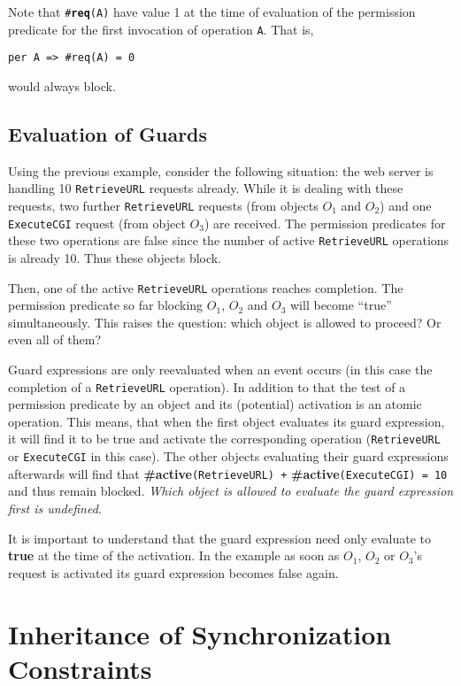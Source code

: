 \documentclass{overturerepchap}
\newcommand{\keyw}[1]{{\bf\ttfamily #1}}
\begin{document}
{\begin{description}
Note that \texttt{\#\keyw{req}(A)} have value 1 at the time of evaluation of
the permission predicate for the first invocation of operation
\texttt{A}. That is,
\begin{lstlisting}
per A => #req(A) = 0
\end{lstlisting}
would always block.

\end{description}

\subsection{Evaluation of Guards}

Using the previous example, consider the following situation: the web
server is handling 10 \texttt{RetrieveURL} requests already. While it
is dealing with these requests, two further \texttt{RetrieveURL}
requests (from objects $O_1$ and $O_2$) and one \texttt{ExecuteCGI}
request (from object $O_3$) are received. The permission predicates
for these two operations are false since the number of active
\texttt{RetrieveURL} operations is already 10. Thus these objects
block.

Then, one of the active \texttt{RetrieveURL} operations reaches
completion. The permission predicate so far blocking $O_1$, $O_2$ and
$O_3$ will become ``true'' simultaneously.
This raises the question: which object is allowed to proceed? Or even
all of them?

Guard expressions are only reevaluated when an event occurs (in this
case the completion of a \texttt{RetrieveURL} operation). In addition to
that the test of a permission predicate by an object and its (potential)
activation is an atomic operation. This means, that when the first
object evaluates its guard expression, it will find it to be true and
activate the corresponding operation (\texttt{RetrieveURL} or
\texttt{ExecuteCGI} in this case). The other objects evaluating their
guard expressions afterwards will find that
\keyw{\#active}{\tt (RetrieveURL) +} \keyw{\#active}{\tt (ExecuteCGI) = 10}
and thus remain blocked. \textit{Which object is allowed to evaluate the guard
expression first is undefined.}

It is important to understand that the guard expression need only
evaluate to \keyw{true} at the time of the activation. In the
example as soon as $O_1$, $O_2$ or $O_3$'s request is activated its
guard expression becomes false again.


\section{Inheritance of Synchronization Constraints}
\label{ch:sync-inh}

}
\end{document}
